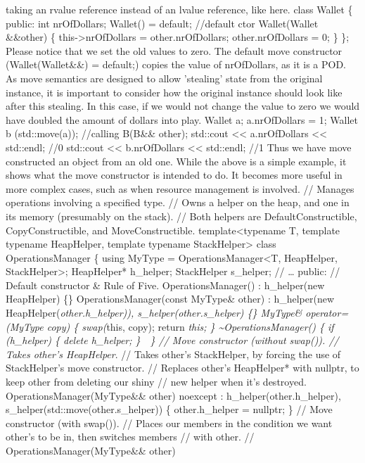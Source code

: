 taking an rvalue reference instead of an lvalue reference, like here.
class Wallet \{ public: int nrOfDollars; Wallet() = default; //default
ctor Wallet(Wallet \&\&other) \{ this-\textgreater nrOfDollars =
other.nrOfDollars; other.nrOfDollars = 0; \} \}; Please notice that we
set the old values to zero. The default move constructor
(Wallet(Wallet\&\&) = default;) copies the value of nrOfDollars, as it
is a POD. As move semantics are designed to allow 'stealing' state from
the original instance, it is important to consider how the original
instance should look like after this stealing. In this case, if we would
not change the value to zero we would have doubled the amount of dollars
into play. Wallet a; a.nrOfDollars = 1; Wallet b (std::move(a));
//calling B(B\&\& other); std::cout \textless\textless{} a.nrOfDollars
\textless\textless{} std::endl; //0 std::cout \textless\textless{}
b.nrOfDollars \textless\textless{} std::endl; //1 Thus we have move
constructed an object from an old one. While the above is a simple
example, it shows what the move constructor is intended to do. It
becomes more useful in more complex cases, such as when resource
management is involved. // Manages operations involving a specified
type. // Owns a helper on the heap, and one in its memory (presumably on
the stack). // Both helpers are DefaultConstructible, CopyConstructible,
and MoveConstructible. template\textless typename T, template typename
HeapHelper, template typename StackHelper\textgreater{} class
OperationsManager \{ using MyType = OperationsManager\textless T,
HeapHelper, StackHelper\textgreater; HeapHelper* h\_helper; StackHelper
s\_helper; // \ldots{} public: // Default constructor \& Rule of Five.
OperationsManager() : h\_helper(new HeapHelper) \{\}
OperationsManager(const MyType\& other) : h\_helper(new
HeapHelper(\emph{other.h\_helper)), s\_helper(other.s\_helper) \{\}
MyType\& operator=(MyType copy) \{ swap(}this, copy); return \emph{this;
\} \textasciitilde OperationsManager() \{ if (h\_helper) \{ delete
h\_helper; \}  \} // Move constructor (without swap()). // Takes
other's HeapHelper}. // Takes other's StackHelper, by forcing the use of
StackHelper's move constructor. // Replaces other's HeapHelper* with
nullptr, to keep other from deleting our shiny // new helper when it's
destroyed. OperationsManager(MyType\&\& other) noexcept :
h\_helper(other.h\_helper), s\_helper(std::move(other.s\_helper)) \{
other.h\_helper = nullptr; \} // Move constructor (with swap()). //
Places our members in the condition we want other's to be in, then
switches members // with other. // OperationsManager(MyType\&\& other)
